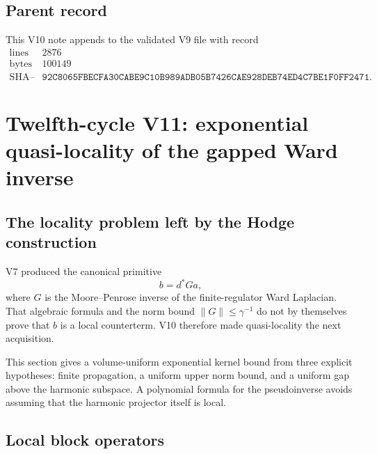 \documentclass[11pt]{article}
\theoremstyle{remark}
\begin{document}
\subsection{Parent record}

This V10 note appends to the validated V9 file with record
\[
\begin{array}{c|c}
\text{lines}&2876\\
\text{bytes}&100149\\
\text{SHA--256}&
\texttt{92C8065FBECFA30CABE9C10B989ADB05B7426CAE928DEB74ED4C7BE1F0FF2471}.
\end{array}
\]


\section{Twelfth-cycle V11: exponential quasi-locality of the gapped
Ward inverse}
\label{sec:v12v11}

\subsection{The locality problem left by the Hodge construction}

V7 produced the canonical primitive
\[
                         b=d^*G a,                          \tag{11.1}
\]
where \(G\) is the Moore--Penrose inverse of the finite-regulator Ward
Laplacian.  That algebraic formula and the norm bound
\(\|G\|\le\gamma^{-1}\) do not by themselves prove that \(b\) is a
local counterterm.  V10 therefore made quasi-locality the next
acquisition.

This section gives a volume-uniform exponential kernel bound from
three explicit hypotheses: finite propagation, a uniform upper norm
bound, and a uniform gap above the harmonic subspace.  A polynomial
formula for the pseudoinverse avoids assuming that the harmonic
projector itself is local.

\subsection{Local block operators}
\end{document}
